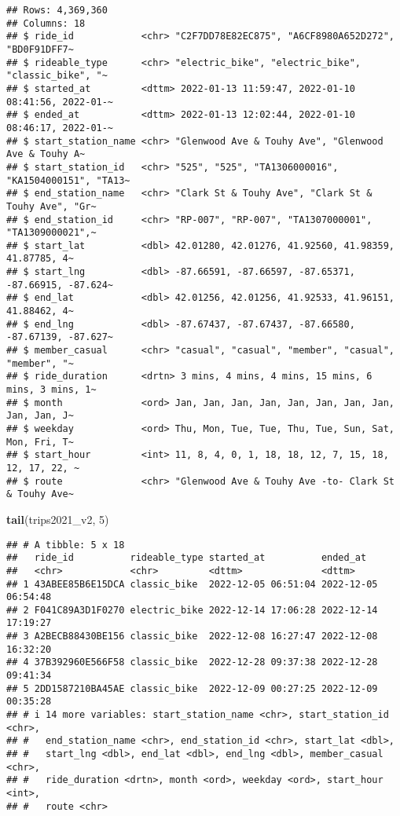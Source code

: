 \documentclass[
]{article}
\newenvironment{Shaded}{\begin{snugshade}}{\end{snugshade}}
\newcommand{\DecValTok}[1]{\textcolor[rgb]{0.00,0.00,0.81}{#1}}
\newcommand{\FunctionTok}[1]{\textcolor[rgb]{0.13,0.29,0.53}{\textbf{#1}}}
\newcommand{\NormalTok}[1]{#1}
\begin{document}
\begin{verbatim}
## Rows: 4,369,360
## Columns: 18
## $ ride_id            <chr> "C2F7DD78E82EC875", "A6CF8980A652D272", "BD0F91DFF7~
## $ rideable_type      <chr> "electric_bike", "electric_bike", "classic_bike", "~
## $ started_at         <dttm> 2022-01-13 11:59:47, 2022-01-10 08:41:56, 2022-01-~
## $ ended_at           <dttm> 2022-01-13 12:02:44, 2022-01-10 08:46:17, 2022-01-~
## $ start_station_name <chr> "Glenwood Ave & Touhy Ave", "Glenwood Ave & Touhy A~
## $ start_station_id   <chr> "525", "525", "TA1306000016", "KA1504000151", "TA13~
## $ end_station_name   <chr> "Clark St & Touhy Ave", "Clark St & Touhy Ave", "Gr~
## $ end_station_id     <chr> "RP-007", "RP-007", "TA1307000001", "TA1309000021",~
## $ start_lat          <dbl> 42.01280, 42.01276, 41.92560, 41.98359, 41.87785, 4~
## $ start_lng          <dbl> -87.66591, -87.66597, -87.65371, -87.66915, -87.624~
## $ end_lat            <dbl> 42.01256, 42.01256, 41.92533, 41.96151, 41.88462, 4~
## $ end_lng            <dbl> -87.67437, -87.67437, -87.66580, -87.67139, -87.627~
## $ member_casual      <chr> "casual", "casual", "member", "casual", "member", "~
## $ ride_duration      <drtn> 3 mins, 4 mins, 4 mins, 15 mins, 6 mins, 3 mins, 1~
## $ month              <ord> Jan, Jan, Jan, Jan, Jan, Jan, Jan, Jan, Jan, Jan, J~
## $ weekday            <ord> Thu, Mon, Tue, Tue, Thu, Tue, Sun, Sat, Mon, Fri, T~
## $ start_hour         <int> 11, 8, 4, 0, 1, 18, 18, 12, 7, 15, 18, 12, 17, 22, ~
## $ route              <chr> "Glenwood Ave & Touhy Ave -to- Clark St & Touhy Ave~
\end{verbatim}

\begin{Shaded}
\begin{Highlighting}[]
\FunctionTok{tail}\NormalTok{(trips2021\_v2, }\DecValTok{5}\NormalTok{)}
\end{Highlighting}
\end{Shaded}

\begin{verbatim}
## # A tibble: 5 x 18
##   ride_id          rideable_type started_at          ended_at           
##   <chr>            <chr>         <dttm>              <dttm>             
## 1 43ABEE85B6E15DCA classic_bike  2022-12-05 06:51:04 2022-12-05 06:54:48
## 2 F041C89A3D1F0270 electric_bike 2022-12-14 17:06:28 2022-12-14 17:19:27
## 3 A2BECB88430BE156 classic_bike  2022-12-08 16:27:47 2022-12-08 16:32:20
## 4 37B392960E566F58 classic_bike  2022-12-28 09:37:38 2022-12-28 09:41:34
## 5 2DD1587210BA45AE classic_bike  2022-12-09 00:27:25 2022-12-09 00:35:28
## # i 14 more variables: start_station_name <chr>, start_station_id <chr>,
## #   end_station_name <chr>, end_station_id <chr>, start_lat <dbl>,
## #   start_lng <dbl>, end_lat <dbl>, end_lng <dbl>, member_casual <chr>,
## #   ride_duration <drtn>, month <ord>, weekday <ord>, start_hour <int>,
## #   route <chr>
\end{verbatim}
\end{document}
